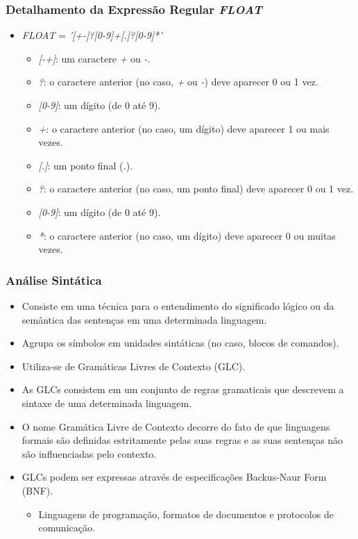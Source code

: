 \documentclass[aspectratio=169]{beamer}
\begin{document}
{  \begin{frame}
    \frametitle{Detalhamento da Expressão Regular \emph{FLOAT}}
    \begin{itemize}
      \item \emph{FLOAT} = \emph{'[+-]?[0-9]+[.]?[0-9]*'}
        \begin{itemize}
          \item \emph{[-+]}: um caractere \emph{+} ou \emph{-}.
          \item \emph{?}: o caractere anterior (no caso, \emph{+} ou \emph{-}) deve aparecer 0 ou 1 vez.
          \item \emph{[0-9]}: um dígito (de 0 até 9).
          \item \emph{+}: o caractere anterior (no caso, um dígito) deve aparecer 1 ou mais vezes.
          \item \emph{[.]}: um ponto final (\emph{.}).
          \item \emph{?}: o caractere anterior (no caso, um ponto final) deve aparecer 0 ou 1 vez.
          \item \emph{[0-9]}: um dígito (de 0 até 9).
          \item \emph{*}: o caractere anterior (no caso, um dígito) deve aparecer 0 ou muitas vezes.
      \end{itemize}
    \end{itemize}
\end{frame}


\begin{frame}
  \frametitle{Análise Sintática}

  \begin{itemize}
    \item Consiste em uma técnica para o entendimento do significado lógico
          ou da semântica das sentenças em uma determinada linguagem.
    \item Agrupa os símbolos em unidades sint\'aticas 
          (no caso, blocos de comandos).
    \item Utiliza-se de Gramáticas Livres de Contexto (GLC).
    \item As GLCs consistem em um conjunto de regras gramaticais que 
          descrevem a sintaxe de uma determinada linguagem.
    \item O nome Gramática Livre de Contexto decorre do fato de que 
          linguagens formais s\~ao definidas estritamente pelas suas 
          regras e as suas senten\c cas n\~ao s\~ao influenciadas pelo 
          contexto.
    \item GLCs podem ser expressas através de especificações Backus-Naur 
          Form (BNF).
          \begin{itemize}
            \item Linguagens de programação, formatos de documentos e 
                  protocolos de comunicação.
          \end{itemize}
  \end{itemize}


\end{frame}}
\end{document}
